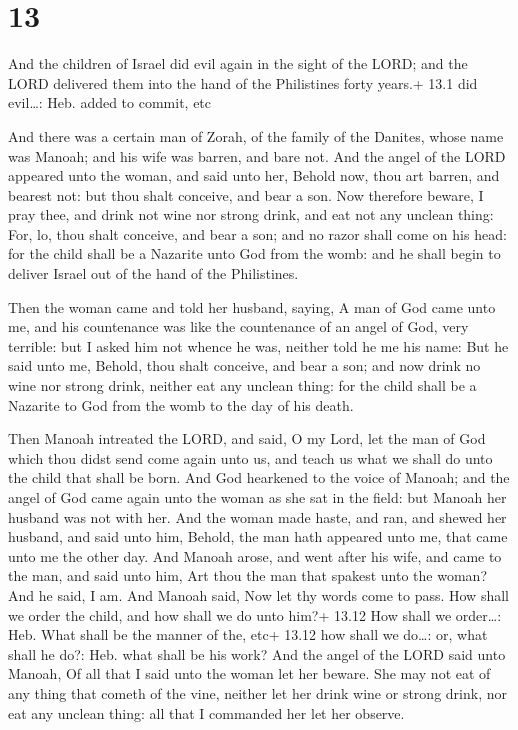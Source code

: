\hypertarget{section-12}{%
\section{13}\label{section-12}}

 And the children of Israel did evil again in the sight of
the LORD; and the LORD delivered them into the hand of the Philistines
forty years.+ 13.1 did evil\ldots: Heb. added to commit, etc

 And there was a certain man of Zorah, of the family of
the Danites, whose name was Manoah; and his wife was barren, and bare
not.  And the angel of the LORD appeared unto the woman, and
said unto her, Behold now, thou art barren, and bearest not: but thou
shalt conceive, and bear a son.  Now therefore beware, I
pray thee, and drink not wine nor strong drink, and eat not any unclean
thing:  For, lo, thou shalt conceive, and bear a son; and no
razor shall come on his head: for the child shall be a Nazarite unto God
from the womb: and he shall begin to deliver Israel out of the hand of
the Philistines.

 Then the woman came and told her husband, saying, A man
of God came unto me, and his countenance was like the countenance of an
angel of God, very terrible: but I asked him not whence he was, neither
told he me his name:  But he said unto me, Behold, thou
shalt conceive, and bear a son; and now drink no wine nor strong drink,
neither eat any unclean thing: for the child shall be a Nazarite to God
from the womb to the day of his death.

 Then Manoah intreated the LORD, and said, O my Lord, let
the man of God which thou didst send come again unto us, and teach us
what we shall do unto the child that shall be born.  And God
hearkened to the voice of Manoah; and the angel of God came again unto
the woman as she sat in the field: but Manoah her husband was not with
her.  And the woman made haste, and ran, and shewed her
husband, and said unto him, Behold, the man hath appeared unto me, that
came unto me the other day.  And Manoah arose, and went
after his wife, and came to the man, and said unto him, Art thou the man
that spakest unto the woman? And he said, I am.  And Manoah
said, Now let thy words come to pass. How shall we order the child, and
how shall we do unto him?+ 13.12 How shall we order\ldots: Heb. What
shall be the manner of the, etc+ 13.12 how shall we do\ldots: or, what
shall he do?: Heb. what shall be his work?  And the angel
of the LORD said unto Manoah, Of all that I said unto the woman let her
beware.  She may not eat of any thing that cometh of the
vine, neither let her drink wine or strong drink, nor eat any unclean
thing: all that I commanded her let her observe.

